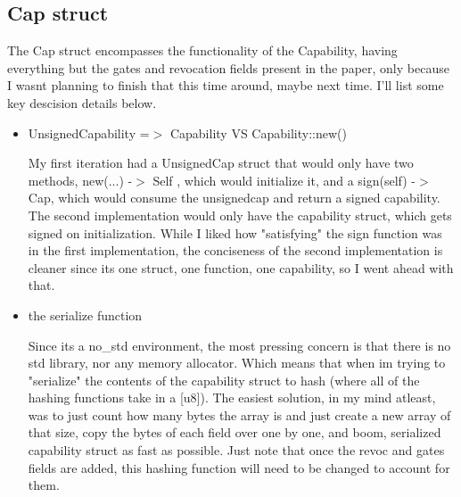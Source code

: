 \documentclass{article}
\begin{document}
\subsection{Cap struct}
The Cap struct encompasses the functionality of the Capability, having
everything but the gates and revocation fields present in the paper, only because
I wasnt planning to finish that this time around, maybe next time. I'll list some
key descision details below.
\begin{itemize}
    \item UnsignedCapability =$>$ Capability VS Capability::new()


        My first iteration had a UnsignedCap struct that would only have two methods,
        new(...) -$>$ Self , which would initialize it, and a sign(self) -$>$ Cap, which would consume
        the unsignedcap and return a signed capability. The second implementation would
        only have the capability struct, which gets signed on initialization. While
        I liked how "satisfying" the sign function was in the first implementation,
        the conciseness of the second implementation is cleaner
        since its one struct, one function, one capability, so I went ahead with that.

    \item the serialize function

        Since its a no_std environment, the most pressing concern is that there is no
        std library, nor any memory allocator. Which means that when im trying to
        "serialize" the contents of the capability struct to hash (where all of
        the hashing functions take in a [u8]). The easiest solution, in my mind atleast,
        was to just count how many bytes the array is and just create a new array of that size,
        copy the bytes of each field over one by one, and boom, serialized capability struct as
        fast as possible. Just note that once the revoc and gates fields are added, this
        hashing function will need to be changed to account for them.

\end{itemize}
\end{document}
